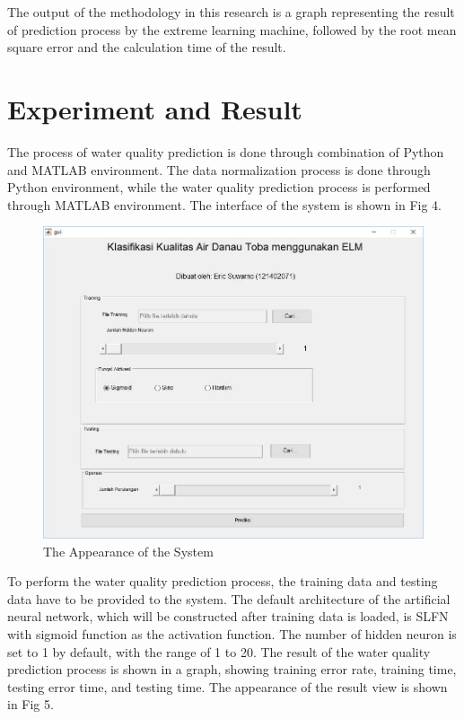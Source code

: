\documentclass[journal,comsoc]{IEEEtran}
\let\MYoriglatexcaption\caption
\renewcommand{\caption}[2][\relax]{\MYoriglatexcaption[#2]{#2}}
\begin{document}
The output of the methodology in this research is a graph representing the result of prediction process by the extreme learning machine, followed by the root mean square error and the calculation time of the result.

\section{Experiment and Result}

The process of water quality prediction is done through combination of Python and MATLAB environment. The data normalization process is done through Python environment, while the water quality prediction process is performed through MATLAB environment. The interface of the system is shown in Fig 4.

\begin{figure}[!th]
\centering
\includegraphics[scale=0.3]{fig-4.jpg}
\caption{The Appearance of the System}
\label{fig4}
\end{figure}

To perform the water quality prediction process, the training data and testing data have to be provided to the system. The default architecture of the artificial neural network, which will be constructed after training data is loaded, is SLFN with sigmoid function as the activation function. The number of hidden neuron is set to 1 by default, with the range of 1 to 20. The result of the water quality prediction process is shown in a graph, showing training error rate, training time, testing error time, and testing time. The appearance of the result view is shown in Fig 5.
\end{document}
